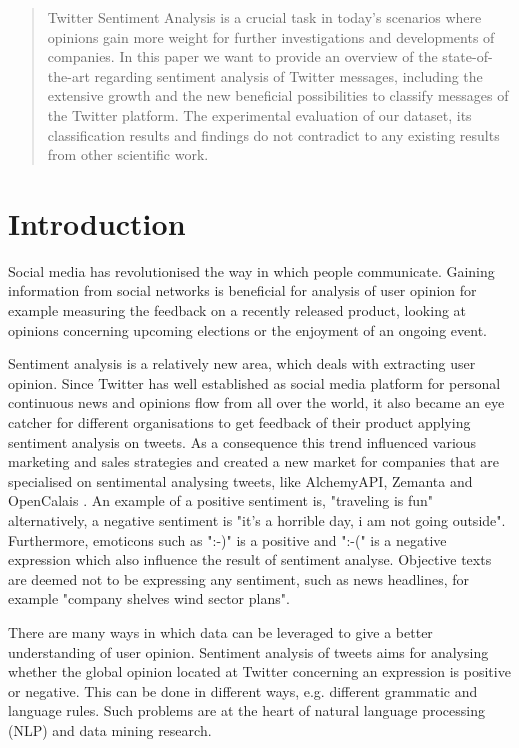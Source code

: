\documentclass{sig-alternate}
\begin{document}
\maketitle
\begin{abstract}
Twitter Sentiment Analysis is a crucial task in today's scenarios where opinions gain more weight for further investigations and developments of companies. In this paper we want to provide an overview of the state-of-the-art regarding sentiment analysis of Twitter messages, including the extensive growth and the new beneficial possibilities to classify messages of the Twitter platform. The experimental evaluation of our dataset,  its classification results and findings do not contradict to any existing results from other scientific work.
\end{abstract}

\section{Introduction}
Social media has revolutionised the way in which people communicate. Gaining information from social networks is beneficial for analysis of user opinion for example measuring the feedback on a recently released product, looking at opinions concerning upcoming elections or the enjoyment of an ongoing event. 

Sentiment analysis is a relatively new area, which deals with extracting user opinion. Since Twitter has well established as social media platform for personal continuous news and opinions flow from all over the world, it also became an eye catcher for different organisations to get feedback of their product applying sentiment analysis on tweets. As a consequence this trend influenced various marketing and sales strategies and created a new market for companies that are specialised on sentimental analysing tweets, like AlchemyAPI, Zemanta and OpenCalais \cite{sentiment2012twitter}. An example of a positive sentiment is, "traveling is fun" alternatively, a negative sentiment is "it's a horrible day, i am not going outside". Furthermore, emoticons such as ":-)" is a positive and ":-(" is a negative expression which also influence the result of sentiment analyse. Objective texts are deemed not to be expressing any sentiment, such as news headlines, for example "company shelves wind sector plans".

There are many ways in which data can be leveraged to give a better understanding of user opinion. Sentiment analysis of tweets aims for analysing whether the global opinion located at Twitter concerning an expression is positive or negative. This can be done in different ways, e.g. different grammatic and language rules. Such problems are at the heart of natural language processing (NLP) and data mining research.
\end{document}
